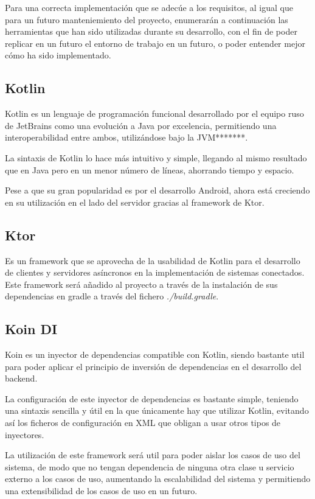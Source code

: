 Para una correcta implementación que se adecúe a los requisitos, al igual que para un futuro manteniemiento del proyecto, enumerarán a continuación las herramientas que han sido utilizadas durante su desarrollo, con el fin de poder replicar en un futuro el entorno de trabajo en un futuro, o poder entender mejor cómo ha sido implementado.

    \subsection{Kotlin}

Kotlin es un lenguaje de programación funcional desarrollado por el equipo ruso de JetBrains como una evolución a Java por excelencia, permitiendo una interoperabilidad entre ambos, utilizándose bajo la JVM*******.

La sintaxis de Kotlin lo hace más intuitivo y simple, llegando al mismo resultado que en Java pero en un menor número de líneas, ahorrando tiempo y espacio.

Pese a que su gran popularidad es por el desarrollo Android, ahora está creciendo en su utilización en el lado del servidor gracias al framework de Ktor. 

    \subsection{Ktor}

Es un framework que se aprovecha de la usabilidad de Kotlin para el desarrollo de clientes y servidores asíncronos en la implementación de sistemas conectados.
Este framework será añadido al proyecto a través de la instalación de sus dependencias en gradle a través del fichero \textit{./build.gradle}.

    \subsection{Koin DI}
    \label{Koin}

Koin es un inyector de dependencias compatible con Kotlin, siendo bastante util para poder aplicar el principio de inversión de dependencias en el desarrollo del backend. 

La configuración de este inyector de dependencias es bastante simple, teniendo una sintaxis sencilla y útil en la que únicamente hay que utilizar Kotlin, evitando así los ficheros de configuración en XML que obligan a usar otros tipos de inyectores.

La utilización de este framework será util para poder aislar los casos de uso del sistema, de modo que no tengan dependencia de ninguna otra clase u servicio externo a los casos de uso, aumentando la escalabilidad del sistema y permitiendo una extensibilidad de los casos de uso en un futuro.

